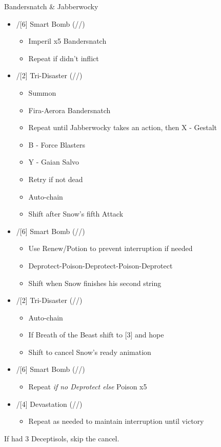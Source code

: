 \begin{multicols}{2}
\renewcommand{\second}{[2]/[4] Devastation (\sab/\com/\com)}
\renewcommand{\fifth}{[5]/[6] Smart Bomb (\sab/\rav/\rav)}
\renewcommand{\sixth}{[6]/[2] Tri-Disaster (\rav/\rav/\rav)}
\begin{battle}{Bandersnatch \& Jabberwocky}
\begin{itemize}
    \item \fifth
    \begin{itemize}
        \item Imperil x5 Bandersnatch
        \item Repeat if didn't inflict
    \end{itemize}
    \item \sixth
    \begin{itemize}
        \item Summon
        \item Fira-Aerora Bandersnatch
        \item Repeat until Jabberwocky takes an action, then X - Gestalt
        \item B - Force Blasters
        \item Y - Gaian Salvo
        \item Retry if not dead
        \item Auto-chain
        \item Shift after Snow's fifth Attack
    \end{itemize}
    \item \fifth
    \begin{itemize}
        \item Use Renew/Potion to prevent interruption if needed
        \item Deprotect-Poison-Deprotect-Poison-Deprotect
        \item Shift when Snow finishes his second string
    \end{itemize}
    \item \sixth
    \begin{itemize}
        \item Auto-chain
        \item If Breath of the Beast shift to [3] and hope
        \item Shift to cancel Snow's ready animation
    \end{itemize}
    \item \fifth
    \begin{itemize}
        \item Repeat \textit{if no Deprotect else } Poison x5
    \end{itemize}
    \item \second
    \begin{itemize}
        \item Repeat as needed to maintain interruption until victory
    \end{itemize}
\end{itemize}
\end{battle}
 If had 3 Deceptisols, skip the cancel.


\end{multicols}
